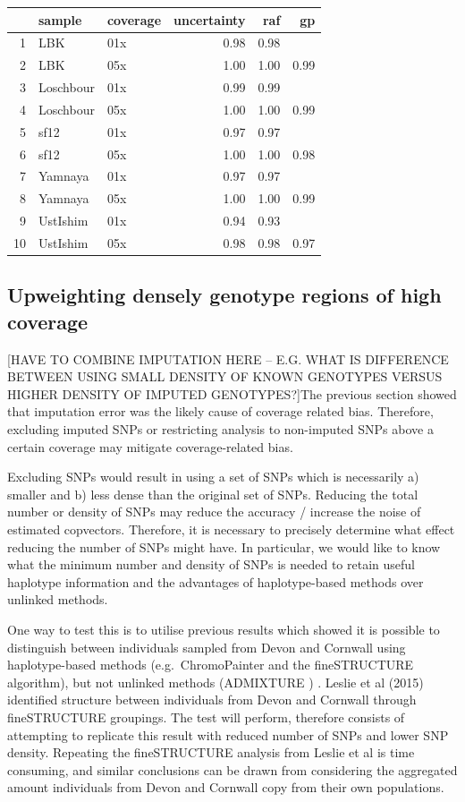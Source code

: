 \begin{table}[ht]
\centering
\begin{tabular}{rllrrr}
  \hline
 & sample & coverage & uncertainty & raf & gp \\ 
  \hline
1 & LBK & 01x & 0.98 & 0.98 &  \\ 
  2 & LBK & 05x & 1.00 & 1.00 & 0.99 \\ 
  3 & Loschbour & 01x & 0.99 & 0.99 &  \\ 
  4 & Loschbour & 05x & 1.00 & 1.00 & 0.99 \\ 
  5 & sf12 & 01x & 0.97 & 0.97 &  \\ 
  6 & sf12 & 05x & 1.00 & 1.00 & 0.98 \\ 
  7 & Yamnaya & 01x & 0.97 & 0.97 &  \\ 
  8 & Yamnaya & 05x & 1.00 & 1.00 & 0.99 \\ 
  9 & UstIshim & 01x & 0.94 & 0.93 &  \\ 
  10 & UstIshim & 05x & 0.98 & 0.98 & 0.97 \\ 
   \hline
\end{tabular}
\end{table}

\subsection{Upweighting densely genotype regions of high coverage}

{\color{red}[HAVE TO COMBINE IMPUTATION HERE -- E.G. WHAT IS DIFFERENCE BETWEEN USING SMALL DENSITY OF KNOWN GENOTYPES VERSUS HIGHER DENSITY OF IMPUTED GENOTYPES?]}The previous section showed that imputation error was the likely cause of coverage related bias. Therefore, excluding imputed SNPs or restricting analysis to non-imputed SNPs above a certain coverage may mitigate coverage-related bias.

Excluding SNPs would result in using a set of SNPs which is necessarily a) smaller and b) less dense than the original set of SNPs. Reducing the total number or density of SNPs may reduce the accuracy / increase the noise of estimated copvectors. Therefore, it is necessary to precisely determine what effect reducing the number of SNPs might have. In particular, we would like to know what the minimum number and density of SNPs is needed to retain useful haplotype information and the advantages of haplotype-based methods over unlinked methods. 

One way to test this is to utilise previous results which showed it is possible to distinguish between individuals sampled from Devon and Cornwall using haplotype-based methods (e.g.\ ChromoPainter and the fineSTRUCTURE algorithm), but not unlinked methods (ADMIXTURE \cite{alexander2009fast}) \cite{Leslie2015}. Leslie et al (2015) identified structure between individuals from Devon and Cornwall through fineSTRUCTURE groupings. The test will perform, therefore consists of attempting to replicate this result with reduced number of SNPs and lower SNP density. Repeating the fineSTRUCTURE analysis from Leslie et al is time consuming, and similar conclusions can be drawn from considering the aggregated amount individuals from Devon and Cornwall copy from their own populations.

